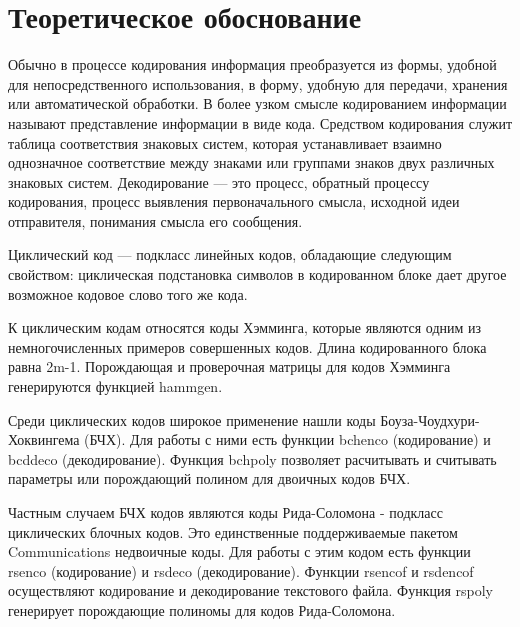 \documentclass[a4paper,12pt]{article}
\begin{document}
\section{Теоретическое обоснование}

Обычно в процессе кодирования информация преобразуется из формы, удобной для непосредственного использования, в форму, удобную для передачи, хранения или автоматической обработки. В более узком смысле кодированием информации называют представление информации в виде кода. Средством кодирования служит таблица соответствия знаковых систем, которая устанавливает взаимно однозначное соответствие между знаками или группами знаков двух различных знаковых систем.
Декодирование — это процесс, обратный процессу кодирования, процесс выявления первоначального смысла, исходной идеи отправителя, понимания смысла его сообщения.

Циклический код — подкласс линейных кодов, обладающие следующим свойством: циклическая подстановка символов в кодированном блоке дает другое возможное кодовое слово того же кода.

К циклическим кодам относятся коды Хэмминга, которые являются одним из немногочисленных примеров совершенных кодов. Длина кодированного блока равна 2m-1. Порождающая и проверочная матрицы для кодов Хэмминга генерируются функцией hammgen. 

Среди циклических кодов широкое применение нашли коды Боуза-Чоудхури-Хоквингема (БЧХ). Для работы с ними есть функции bchenco (кодирование) и bcddeco (декодирование). Функция bchpoly позволяет расчитывать и считывать параметры или порождающий полином для двоичных кодов БЧХ.

Частным случаем БЧХ кодов являются коды Рида-Соломона - подкласс циклических блочных кодов. Это единственные поддерживаемые пакетом Communications недвоичные коды. Для работы с этим кодом есть функции rsenco (кодирование) и rsdeco (декодирование). Функции rsencof и rsdencof осуществляют кодирование и декодирование текстового файла. Функция rspoly генерирует порождающие полиномы для кодов Рида-Соломона.
\newpage
\end{document}
